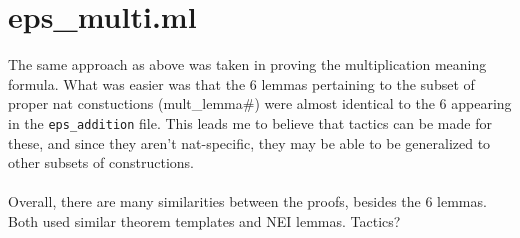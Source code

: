 \documentclass{article}
\def\c#1{\texttt{#1}}
\begin{document}
\newpage
\section{eps\_multi.ml}
The same approach as above was taken in proving the multiplication meaning formula. What was easier was that the 6 lemmas pertaining to the subset of proper nat constuctions (mult\_lemma\#) were almost identical to the 6 appearing in the \c{eps\_addition} file. This leads me to believe that tactics can be made for these, and since they aren't nat-specific, they may be able to be generalized to other subsets of constructions. 
\\
\\
Overall, there are many similarities between the proofs, besides the 6 lemmas. Both used similar theorem templates and NEI lemmas. Tactics?
\end{document}
